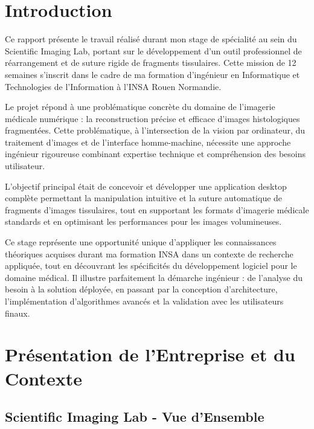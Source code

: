 \documentclass[12pt,a4paper]{article}
\begin{document}
\newpage
\tableofcontents

\newpage
\listoffigures
\listoftables

\newpage
\section{Introduction}

Ce rapport présente le travail réalisé durant mon stage de spécialité au sein du Scientific Imaging Lab, portant sur le développement d'un outil professionnel de réarrangement et de suture rigide de fragments tissulaires. Cette mission de 12 semaines s'inscrit dans le cadre de ma formation d'ingénieur en Informatique et Technologies de l'Information à l'INSA Rouen Normandie.

Le projet répond à une problématique concrète du domaine de l'imagerie médicale numérique : la reconstruction précise et efficace d'images histologiques fragmentées. Cette problématique, à l'intersection de la vision par ordinateur, du traitement d'images et de l'interface homme-machine, nécessite une approche ingénieur rigoureuse combinant expertise technique et compréhension des besoins utilisateur.

L'objectif principal était de concevoir et développer une application desktop complète permettant la manipulation intuitive et la suture automatique de fragments d'images tissulaires, tout en supportant les formats d'imagerie médicale standards et en optimisant les performances pour les images volumineuses.

Ce stage représente une opportunité unique d'appliquer les connaissances théoriques acquises durant ma formation INSA dans un contexte de recherche appliquée, tout en découvrant les spécificités du développement logiciel pour le domaine médical. Il illustre parfaitement la démarche ingénieur : de l'analyse du besoin à la solution déployée, en passant par la conception d'architecture, l'implémentation d'algorithmes avancés et la validation avec les utilisateurs finaux.

\newpage

\section{Présentation de l'Entreprise et du Contexte}

\subsection{Scientific Imaging Lab - Vue d'Ensemble}
\end{document}
